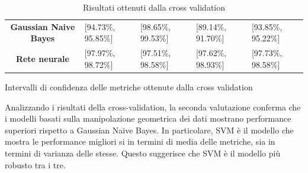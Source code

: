 \begin{table}[!ht]
\begin{subtable}[h]{1\textwidth}
\begin{tabular}{@{}cllll@{}}
            \cellcolor[HTML]{EFEFEF}\textbf{Gaussian Naive Bayes} & [94.73\%, 95.85\%]   & [98.65\%, 99.53\%]  & [89.14\%, 91.70\%] & [93.85\%, 95.22\%] \\
            \cellcolor[HTML]{EFEFEF}\textbf{Rete neurale}         & [97.97\%, 98.72\%]   & [97.51\%, 98.58\%]  & [97.62\%, 98.93\%] & [97.73\%, 98.58\%] \\ \bottomrule
        \end{tabular}
        \caption{Intervalli di confidenza delle metriche ottenute dalla cross validation}
        \label{tab:intervalli_confidenza_pca}
    \end{subtable}
    \caption{Risultati ottenuti dalla cross validation}
    \label{tab:media_intervalli_confidenza_pca}
\end{table}

Analizzando i risultati della cross-validation, la seconda valutazione conferma che i modelli
basati sulla manipolazione geometrica dei dati mostrano performance
superiori rispetto a Gaussian Naive Bayes. In particolare, SVM è il modello che
mostra le performance migliori si in termini di media delle metriche, sia in
termini di varianza delle stesse. Questo suggerisce che SVM è il modello più
robusto tra i tre.

